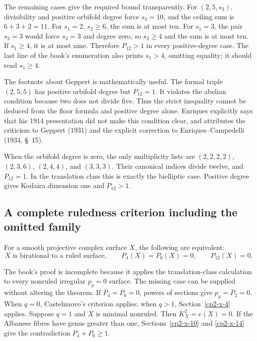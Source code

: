 The remaining cases give the required bound transparently. For $(2,5,s_3)$, divisibility and positive orbifold degree force $s_3=10$, and the ceiling sum is $6+3+2=11$. For $s_1=2$, $s_2\geq6$, the sum is at most ten. For $s_1=3$, the pair $s_2=3$ would force $s_3=3$ and degree zero, so $s_2\geq4$ and the sum is at most ten. If $s_1\geq4$, it is at most nine. Therefore $P_{12}>1$ in every positive-degree case. The last line of the book's enumeration also prints $s_1>4$, omitting equality; it should read $s_1\geq4$.

The footnote about Geppert is mathematically useful. The formal triple $(2,5,5)$ has positive orbifold degree but $P_{12}=1$. It violates the abelian condition because two does not divide five. Thus the strict inequality cannot be deduced from the floor formula and positive degree alone. Enriques explicitly says that his 1914 presentation did not make this condition clear, and attributes the criticism to Geppert (1931) and the explicit correction to Enriques--Campedelli (1934, \S~15).

When the orbifold degree is zero, the only multiplicity lists are $(2,2,2,2)$, $(2,3,6)$, $(2,4,4)$, and $(3,3,3)$. Their canonical indices divide twelve, and $P_{12}=1$. In the translation class this is exactly the bielliptic case. Positive degree gives Kodaira dimension one and $P_{12}>1$.

\subsection{A complete ruledness criterion including the omitted family}

\begin{theorem}
\label{cp2-x-ruled-criterion}
For a smooth projective complex surface $X$, the following are equivalent:
\[
 X\text{ is birational to a ruled surface},\qquad
 P_4(X)=P_6(X)=0,\qquad P_{12}(X)=0.
\]
\end{theorem}

The book's proof is incomplete because it applies the translation-class calculation to every nonruled irregular $p_g=0$ surface. The missing case can be supplied without altering the theorem. If $P_4=P_6=0$, powers of sections give $p_g=P_2=0$. When $q=0$, Castelnuovo's criterion applies; when $q>1$, Section~\ref{cp2-x-4} applies. Suppose $q=1$ and $X$ is minimal nonruled. Then $K_X^2=e(X)=0$. If the Albanese fibres have genus greater than one, Sections~\ref{cp2-x-10} and \ref{cp2-x-14} give the contradiction $P_4+P_6\geq1$.

